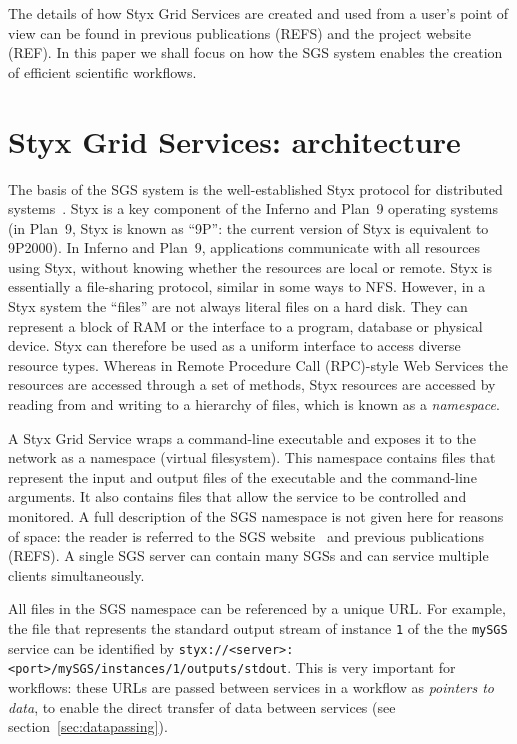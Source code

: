 \documentclass[a4paper]{article}
\begin{document}
The details of how Styx Grid Services are created and used from a user's point of view can be found in previous publications (REFS) and the project website (REF).  In this paper we shall focus on how the SGS system enables the creation of efficient scientific workflows. 

\section{Styx Grid Services: architecture}

The basis of the SGS system is the well-established Styx protocol for distributed systems~\cite{Pike:1999}.  Styx is a key component of the Inferno \cite{Inferno} and Plan~9 \cite{Plan9} operating systems (in Plan~9, Styx is known as ``9P'': the current version of Styx is equivalent to 9P2000).  In Inferno and Plan~9, applications communicate with all resources using Styx, without knowing whether the resources are local or remote.  Styx is essentially a file-sharing protocol, similar in some ways to NFS.  However, in a Styx system the ``files'' are not always literal files on a hard disk.  They can represent a block of RAM or the interface to a program, database or physical device.  Styx can therefore be used as a uniform interface to access diverse resource types.  Whereas in Remote Procedure Call (RPC)-style Web Services the resources are accessed through a set of methods, Styx resources are accessed by reading from and writing to a hierarchy of files, which is known as a \textit{namespace\/}.

A Styx Grid Service wraps a command-line executable and exposes it to the network as a namespace (virtual filesystem).  This namespace contains files that represent the input and output files of the executable and the command-line arguments.  It also contains files that allow the service to be controlled and monitored.  A full description of the SGS namespace is not given here for reasons of space: the reader is referred to the SGS website~\cite{sgswebsite} and previous publications (REFS).  A single SGS server can contain many SGSs and can service multiple clients simultaneously.

All files in the SGS namespace can be referenced by a unique URL.  For example, the file that represents the standard output stream of instance \texttt{1} of the the \texttt{mySGS} service can be identified by \texttt{styx://<server>:<port>/mySGS/instances/1/outputs/stdout}.  This is very important for workflows: these URLs are passed between services in a workflow as \textit{pointers to data}, to enable the direct transfer of data between services (see section~\ref{sec:datapassing}).
\end{document}
